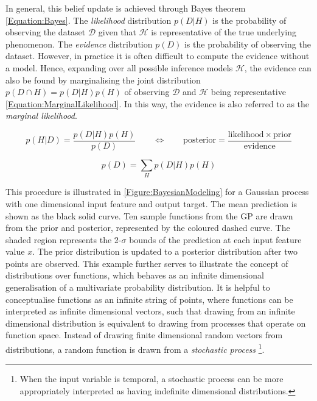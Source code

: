 			In general, this belief update is achieved through Bayes theorem \eqref{Equation:Bayes}. The \textit{likelihood} distribution $p(D | H)$ is the probability of observing the dataset $\mathcal{D}$ given that $\mathcal{H}$ is representative of the true underlying phenomenon. The \textit{evidence} distribution $p(D)$ is the probability of observing the dataset. However, in practice it is often difficult to compute the evidence without a model. Hence, expanding over all possible inference models $\mathcal{H}$, the evidence can also be found by marginalising the joint distribution $p(D \cap H) = p(D | H) p(H)$ of observing $\mathcal{D}$ and $\mathcal{H}$ being representative \eqref{Equation:MarginalLikelihood}. In this way, the evidence is also referred to as the \textit{marginal likelihood}.
			
			\begin{equation}
				p(H | D) = \frac{p(D | H) p(H)}{p(D)} \qquad \Longleftrightarrow \qquad \mathrm{posterior} = \frac{\mathrm{likelihood} \times \mathrm{prior}}{\mathrm{evidence}}
			\label{Equation:Bayes}
			\end{equation}
			
			\begin{equation}
				p(D) = \sum_{H} p(D | H) p(H)
			\label{Equation:MarginalLikelihood}
			\end{equation}			
			
			This procedure is illustrated in \cref{Figure:BayesianModeling} for a Gaussian process with one dimensional input feature and output target. The mean prediction is shown as the black solid curve. Ten sample functions from the GP are drawn from the prior and posterior, represented by the coloured dashed curve. The shaded region represents the 2-$\sigma$ bounds of the prediction at each input feature value $x$. The prior distribution is updated to a posterior distribution after two points are observed. This example further serves to illustrate the concept of distributions over functions, which behaves as an infinite dimensional generalisation of a multivariate probability distribution. It is helpful to conceptualise functions as an infinite string of points, where functions can be interpreted as infinite dimensional vectors, such that drawing from an infinite dimensional distribution is equivalent to drawing from processes that operate on function space. Instead of drawing finite dimensional random vectors from distributions, a random function is drawn from a \textit{stochastic process} \footnote{When the input variable is temporal, a stochastic process can be more appropriately interpreted as having indefinite dimensional distributions.}.
			
